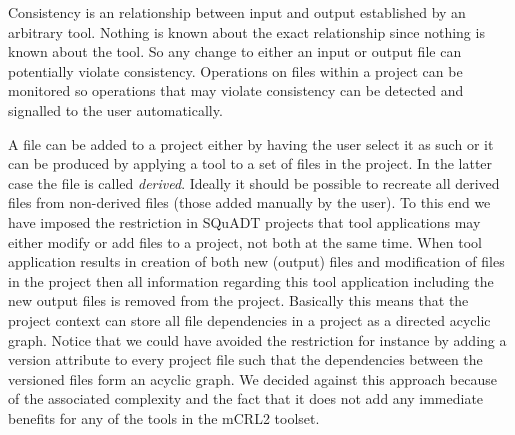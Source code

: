 \documentclass{article}
\newcommand{\squadt}{SQuADT\xspace}
\begin{document}
  Consistency is an relationship between input and output established by an
  arbitrary tool. Nothing is known about the exact relationship since nothing
  is known about the tool. So any change to either an input or output file can
  potentially violate consistency. Operations on files within a project can be
  monitored so operations that may violate consistency can be detected and
  signalled to the user automatically.

\enlargethispage*{20pt}
  A file can be added to a project either by having the user select it as such
  or it can be produced by applying a tool to a set of files in the project. In
  the latter case the file is called \textit{derived}. Ideally it should be
  possible to recreate all derived files from non-derived files (those added
  manually by the user). To this end we have imposed the restriction in \squadt
  projects that tool applications may either modify or add files to a project,
  not both at the same time. When tool application results in creation of both
  new (output) files and modification of files in the project then all
  information regarding this tool application including the new output files is
  removed from the project.  Basically this means that the project context can
  store all file dependencies in a project as a directed acyclic graph. Notice
  that we could have avoided the restriction for instance by adding a version
  attribute to every project file such that the dependencies between the
  versioned files form an acyclic graph. We decided against this approach
  because of the associated complexity and the fact that it does not add any
  immediate benefits for any of the tools in the mCRL2 toolset.
\end{document}

